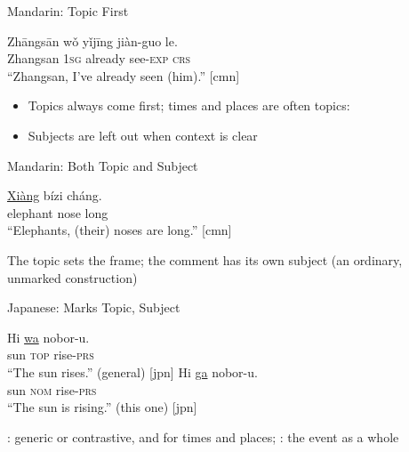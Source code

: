 \documentclass{beamer}
\begin{document}
\begin{frame}{Mandarin: Topic First}
  \begin{exe}
    \ex
    \gll Zhāngsān wǒ yǐjīng jiàn-guo le. \\
         Zhangsan 1\textsc{sg} already see-\textsc{exp} \textsc{crs} \\
    \trans ``Zhangsan, I've already seen (him).'' [cmn]
  \end{exe}
  \vfill
  \large
  \begin{itemize}
  \item Topics always come first; times and places are often topics:
  \item Subjects are left out when context is clear
  \end{itemize}
\end{frame}

\begin{frame}{Mandarin: Both Topic and Subject}
  \begin{exe}
    \ex
    \gll \ul{Xiàng} bízi cháng. \\
         elephant nose long \\
    \trans ``Elephants, (their) noses are long.'' [cmn]
  \end{exe}
  \vfill
  \large
  The topic sets the frame; the comment has its own subject
  (an ordinary, unmarked construction)
\end{frame}

\begin{frame}{Japanese:  Marks Topic,  Subject}
  \begin{exe}
    \ex
    \gll Hi \ul{wa} nobor-u. \\
         sun \textsc{top} rise-\textsc{prs} \\
    \trans ``The sun rises.'' (general) [jpn]
    \ex
    \gll Hi \ul{ga} nobor-u. \\
         sun \textsc{nom} rise-\textsc{prs} \\
    \trans ``The sun is rising.'' (this one) [jpn]
  \end{exe}
  \vfill
  \large
  : generic or contrastive, and for times and places;
  : the event as a whole
\end{frame}
\end{document}
